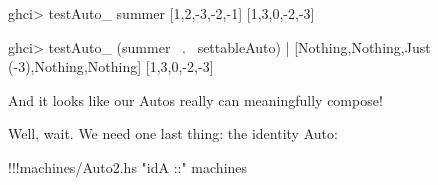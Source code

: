 \documentclass[]{article}
\newenvironment{Shaded}{}{}
\newcommand{\DataTypeTok}[1]{\textcolor[rgb]{0.56,0.13,0.00}{{#1}}}
\newcommand{\DecValTok}[1]{\textcolor[rgb]{0.25,0.63,0.44}{{#1}}}
\newcommand{\StringTok}[1]{\textcolor[rgb]{0.25,0.44,0.63}{{#1}}}
\newcommand{\FunctionTok}[1]{\textcolor[rgb]{0.02,0.16,0.49}{{#1}}}
\newcommand{\NormalTok}[1]{{#1}}
\begin{document}
\begin{Shaded}
\begin{Highlighting}[]
\NormalTok{ghci}\FunctionTok{>} \NormalTok{testAuto_ summer [}\DecValTok{1}\NormalTok{,}\DecValTok{2}\NormalTok{,}\FunctionTok{-}\DecValTok{3}\NormalTok{,}\FunctionTok{-}\DecValTok{2}\NormalTok{,}\FunctionTok{-}\DecValTok{1}\NormalTok{]}
\NormalTok{[}\DecValTok{1}\NormalTok{,}\DecValTok{3}\NormalTok{,}\DecValTok{0}\NormalTok{,}\FunctionTok{-}\DecValTok{2}\NormalTok{,}\FunctionTok{-}\DecValTok{3}\NormalTok{]}

\NormalTok{ghci}\FunctionTok{>} \NormalTok{testAuto_ (summer }\FunctionTok{~.~} \NormalTok{settableAuto)}
    \FunctionTok{|}     \NormalTok{[}\DataTypeTok{Nothing}\NormalTok{,}\DataTypeTok{Nothing}\NormalTok{,}\DataTypeTok{Just} \NormalTok{(}\FunctionTok{-}\DecValTok{3}\NormalTok{),}\DataTypeTok{Nothing}\NormalTok{,}\DataTypeTok{Nothing}\NormalTok{]}
\NormalTok{[}\DecValTok{1}\NormalTok{,}\DecValTok{3}\NormalTok{,}\DecValTok{0}\NormalTok{,}\FunctionTok{-}\DecValTok{2}\NormalTok{,}\FunctionTok{-}\DecValTok{3}\NormalTok{]}
\end{Highlighting}
\end{Shaded}

And it looks like our Autos really can meaningfully compose!

Well, wait. We need one last thing: the identity Auto:

\begin{Shaded}
\begin{Highlighting}[]
\FunctionTok{!!!}\NormalTok{machines}\FunctionTok{/}\NormalTok{Auto2.hs }\StringTok{"idA ::"} \NormalTok{machines}
\end{Highlighting}
\end{Shaded}
\end{document}

